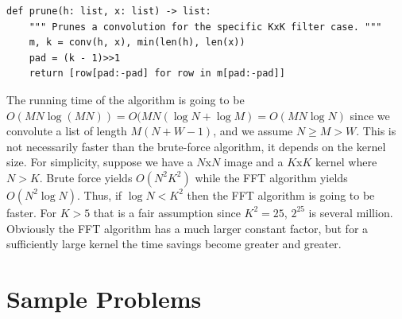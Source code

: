 \documentclass[11pt, oneside]{article}
\theoremstyle{plain}
\theoremstyle{definition}
\begin{document}
\begin{verbatim}
def prune(h: list, x: list) -> list:
    """ Prunes a convolution for the specific KxK filter case. """
    m, k = conv(h, x), min(len(h), len(x))
    pad = (k - 1)>>1
    return [row[pad:-pad] for row in m[pad:-pad]]
\end{verbatim}

The running time of the algorithm is going to be
\( O(MN \log(MN)) = O(MN(\log N + \log M) = O(MN \log N) \) since we convolute 
a list of length \( M(N + W - 1) \), and we assume \( N \geq M > W \).
This is not necessarily faster than the brute-force algorithm,
it depends on the kernel size. For simplicity, suppose we have a \( N \)x\( N \)
image and a \( K \)x\( K \) kernel where \( N > K \). Brute force yields
\( O(N^2 K^2) \) while the FFT algorithm yields \( O(N^2 \log N) \).
Thus, if \( \log N < K^2 \) then the FFT algorithm is going to be faster.
For \( K > 5 \) that is a fair assumption since \( K^2 = 25 \), \( 2^{25} \)
is several million. Obviously the FFT algorithm has a much larger constant
factor, but for a sufficiently large kernel the time savings become greater
and greater.

\section{Sample Problems}
\end{document}
